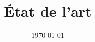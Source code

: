\title{\vspace{1.5cm}État de l'art \\ \vspace{0.25cm} \LARGE{\textbf{\projecttitle}}}
\author{}
\date{\today}